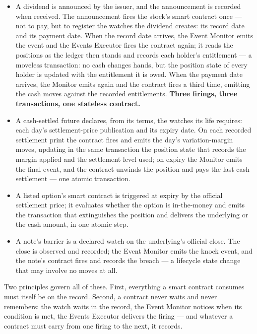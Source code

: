 \documentclass[11pt,a4paper]{article}
\begin{document}
\begin{itemize}
\item
  A dividend is announced by the issuer, and the announcement is
  recorded when received. The announcement fires the stock's smart
  contract once --- not to pay, but to register the watches the dividend
  creates: its record date and its payment date. When the record date
  arrives, the Event Monitor emits the event and the Events Executor
  fires the contract again; it reads the positions as the ledger then
  stands and records each holder's entitlement --- a moveless
  transaction: no cash changes hands, but the position state of every
  holder is updated with the entitlement it is owed. When the payment
  date arrives, the Monitor emits again and the contract fires a third
  time, emitting the cash moves against the recorded entitlements.
  \textbf{Three firings, three transactions, one stateless contract.}
\item
  A cash-settled future declares, from its terms, the watches its life
  requires: each day's settlement-price publication and its expiry date.
  On each recorded settlement print the contract fires and emits the
  day's variation-margin moves, updating in the same transaction the
  position state that records the margin applied and the settlement
  level used; on expiry the Monitor emits the final event, and the
  contract unwinds the position and pays the last cash settlement ---
  one atomic transaction.
\item
  A listed option's smart contract is triggered at expiry by the
  official settlement price; it evaluates whether the option is
  in-the-money and emits the transaction that extinguishes the position
  and delivers the underlying or the cash amount, in one atomic step.
\item
  A note's barrier is a declared watch on the underlying's official
  close. The close is observed and recorded; the Event Monitor emits the
  knock event, and the note's contract fires and records the breach ---
  a lifecycle state change that may involve no moves at all.
\end{itemize}

Two principles govern all of these. First, everything a smart contract
consumes must itself be on the record. Second, a contract never waits
and never remembers: the watch waits in the record, the Event Monitor
notices when its condition is met, the Events Executor delivers the
firing --- and whatever a contract must carry from one firing to the
next, it records.
\end{document}
